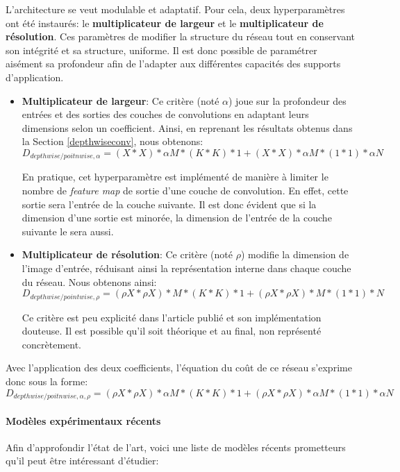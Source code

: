 \noindent L'architecture se veut modulable et adaptatif. Pour cela, deux hyperparamètres ont été instaurés: le \textbf{multiplicateur de largeur} et le \textbf{multiplicateur de résolution}. Ces paramètres de modifier la structure du réseau tout en conservant son intégrité et sa structure, uniforme. Il est donc possible de paramétrer aisément sa profondeur afin de l'adapter aux différentes capacités des supports d'application.

\begin{itemize}
    \item \textbf{Multiplicateur de largeur}: Ce critère (noté $\alpha$) joue sur la profondeur des entrées et des sorties des couches de convolutions en adaptant leurs dimensions selon un coefficient. Ainsi, en reprenant les résultats obtenus dans la Section \ref{depthwiseconv}, nous obtenons: $$D_{depthwise/poitnwise, \alpha}=(X*X)*\alpha M*(K*K)*1+(X*X)*\alpha M*(1*1)*\alpha N$$

    En pratique, cet hyperparamètre est implémenté de manière à limiter le nombre de \textit{feature map} de sortie d'une couche de convolution. En effet, cette sortie sera l'entrée de la couche suivante. Il est donc évident que si la dimension d'une sortie est minorée, la dimension de l'entrée de la couche suivante le sera aussi.

    \item \textbf{Multiplicateur de résolution}: Ce critère (noté $\rho$) modifie la dimension de l'image d'entrée, réduisant ainsi la représentation interne dans chaque couche du réseau. Nous obtenons ainsi:
    $$D_{depthwise/pointwise, \rho}=(\rho X*\rho X)*M*(K*K)*1+(\rho X*\rho X)*M*(1*1)*N$$

    Ce critère est peu explicité dans l'article publié et son implémentation douteuse. Il est possible qu'il soit théorique et au final, non représenté concrètement.
\end{itemize}

\noindent Avec l'application des deux coefficients, l'équation du coût de ce réseau s'exprime donc sous la forme:
$$D_{depthwise/poitnwise,\alpha,\rho}=(\rho X*\rho X)*\alpha M*(K*K)*1+(\rho X*\rho X)*\alpha M*(1*1)*\alpha N$$

\paragraph{Modèles expérimentaux récents}

Afin d'approfondir l'état de l'art, voici une liste de modèles récents prometteurs qu'il peut être intéressant d'étudier:

